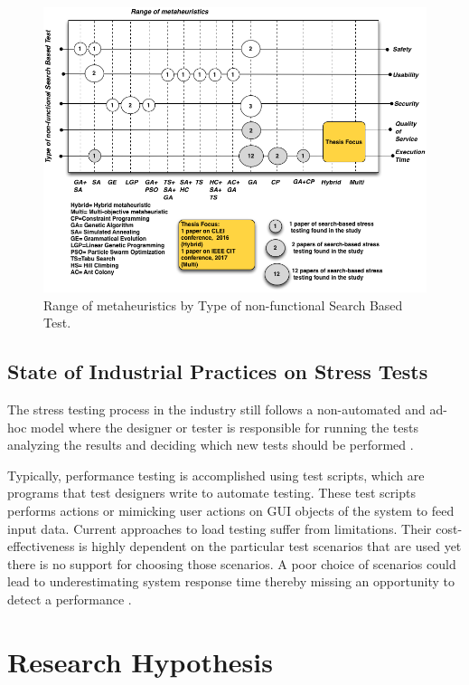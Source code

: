 \documentclass{report}
\begin{document}
\begin{figure}[h]
\centering
\includegraphics[width=1\textwidth]{./images/metaheuristics.png}
\caption{Range of metaheuristics by Type of non-functional Search Based Test\cite{Afzal2009a}. }
\label{fig:metabykind}
\end{figure}



\subsection{State of Industrial Practices on Stress Tests}

The stress testing process in the industry still follows a non-automated and ad-hoc model where the designer or tester is responsible for running the tests analyzing the results and deciding which new tests should be performed \cite{Lewis2005}.

Typically, performance testing is accomplished using test scripts, which are programs that test designers write to automate testing. These test scripts performs actions or mimicking user actions on GUI objects of the system to feed input data. Current approaches to load testing suffer from limitations. Their cost-effectiveness is highly dependent on the particular test scenarios that are used yet there is no support for choosing those scenarios. A poor choice of scenarios could lead to underestimating system response time thereby missing an opportunity to detect a performance \cite{Grechanik2012}.




\section{Research Hypothesis}
\end{document}
